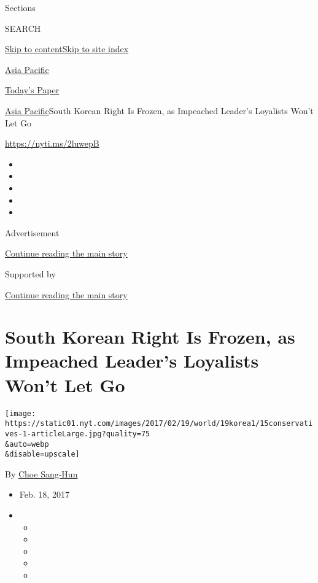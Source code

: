 Sections

SEARCH

\protect\hyperlink{site-content}{Skip to
content}\protect\hyperlink{site-index}{Skip to site index}

\href{https://www.nytimes.com/section/world/asia}{Asia Pacific}

\href{https://myaccount.nytimes.com/auth/login?response_type=cookie\&client_id=vi}{}

\href{https://www.nytimes.com/section/todayspaper}{Today's Paper}

\href{/section/world/asia}{Asia Pacific}\textbar{}South Korean Right Is
Frozen, as Impeached Leader's Loyalists Won't Let Go

\url{https://nyti.ms/2luwepB}

\begin{itemize}
\item
\item
\item
\item
\item
\end{itemize}

Advertisement

\protect\hyperlink{after-top}{Continue reading the main story}

Supported by

\protect\hyperlink{after-sponsor}{Continue reading the main story}

\hypertarget{south-korean-right-is-frozen-as-impeached-leaders-loyalists-wont-let-go}{%
\section{South Korean Right Is Frozen, as Impeached Leader's Loyalists
Won't Let
Go}\label{south-korean-right-is-frozen-as-impeached-leaders-loyalists-wont-let-go}}

\texttt{[image: https://static01.nyt.com/images/2017/02/19/world/19korea1/15conservatives-1-articleLarge.jpg?quality=75\\\&auto=webp\\\&disable=upscale]}

By \href{http://www.nytimes.com/by/choe-sang-hun}{Choe Sang-Hun}

\begin{itemize}
\item
  Feb. 18, 2017
\item
  \begin{itemize}
  \item
  \item
  \item
  \item
  \item
  \end{itemize}
\end{itemize}

